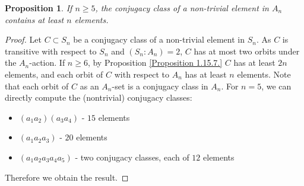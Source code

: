 \documentclass[12pt]{report}
\theoremstyle{plain}
\newtheorem{proposition}[theorem]{Proposition}
\theoremstyle{remark}
\theoremstyle{definition}
\begin{document}
\begin{proposition}
    If $n\ge 5$, the conjugacy class of a non-trivial element in $A_n$ contains at least $n$ elements.
\end{proposition}
\begin{proof}
    Let $C\subset S_n$ be a conjugacy class of a non-trivial element in $S_n$. As $C$ is transitive with respect to $S_n$ and $(S_n:A_n)=2$, $C$ has at most two orbits under the $A_n$-action. If $n\ge 6$, by Proposition \ref{Proposition 1.15.7.} $C$ has at least $2n$ elements, and each orbit of $C$ with respect to $A_n$ has at least $n$ elements. Note that each orbit of $C$ as an $A_n$-set is a conjugacy class in $A_n$. For $n=5$, we can directly compute the (nontrivial) conjugacy classes:
    \begin{itemize}
        \item $(a_1a_2)(a_3a_4)$ - $15$ elements
        \item $(a_1a_2a_3)$ - $20$ elements
        \item $(a_1a_2a_3a_4a_5)$ - two conjugacy classes, each of $12$ elements
    \end{itemize}
    Therefore we obtain the result.
\end{proof}
\end{document}
